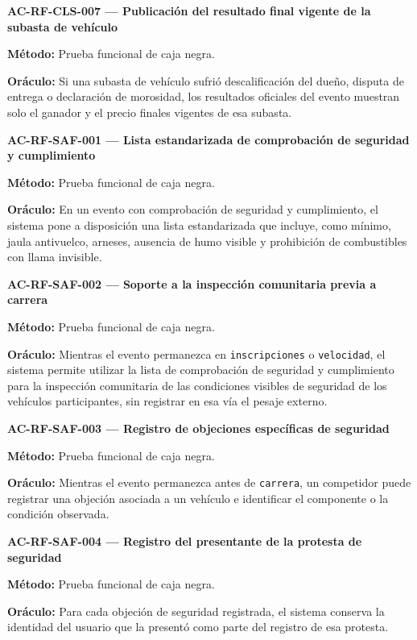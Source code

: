 \documentclass[10pt,letterpaper]{article}
\begin{document}
\noindent\textbf{AC-RF-CLS-007 --- Publicación del resultado final vigente de la subasta de vehículo}\par
\textbf{Método:} Prueba funcional de caja negra.\par
\textbf{Oráculo:} Si una subasta de vehículo sufrió descalificación del dueño, disputa de entrega o declaración de morosidad, los resultados oficiales del evento muestran solo el ganador y el precio finales vigentes de esa subasta.\par\vspace{0.45em}
\noindent\textbf{AC-RF-SAF-001 --- Lista estandarizada de comprobación de seguridad y cumplimiento}\par
\textbf{Método:} Prueba funcional de caja negra.\par
\textbf{Oráculo:} En un evento con comprobación de seguridad y cumplimiento, el sistema pone a disposición una lista estandarizada que incluye, como mínimo, jaula antivuelco, arneses, ausencia de humo visible y prohibición de combustibles con llama invisible.\par\vspace{0.45em}
\noindent\textbf{AC-RF-SAF-002 --- Soporte a la inspección comunitaria previa a carrera}\par
\textbf{Método:} Prueba funcional de caja negra.\par
\textbf{Oráculo:} Mientras el evento permanezca en \texttt{inscripciones} o \texttt{velocidad}, el sistema permite utilizar la lista de comprobación de seguridad y cumplimiento para la inspección comunitaria de las condiciones visibles de seguridad de los vehículos participantes, sin registrar en esa vía el pesaje externo.\par\vspace{0.45em}
\noindent\textbf{AC-RF-SAF-003 --- Registro de objeciones específicas de seguridad}\par
\textbf{Método:} Prueba funcional de caja negra.\par
\textbf{Oráculo:} Mientras el evento permanezca antes de \texttt{carrera}, un competidor puede registrar una objeción asociada a un vehículo e identificar el componente o la condición observada.\par\vspace{0.45em}
\noindent\textbf{AC-RF-SAF-004 --- Registro del presentante de la protesta de seguridad}\par
\textbf{Método:} Prueba funcional de caja negra.\par
\textbf{Oráculo:} Para cada objeción de seguridad registrada, el sistema conserva la identidad del usuario que la presentó como parte del registro de esa protesta.\par\vspace{0.45em}
\end{document}
